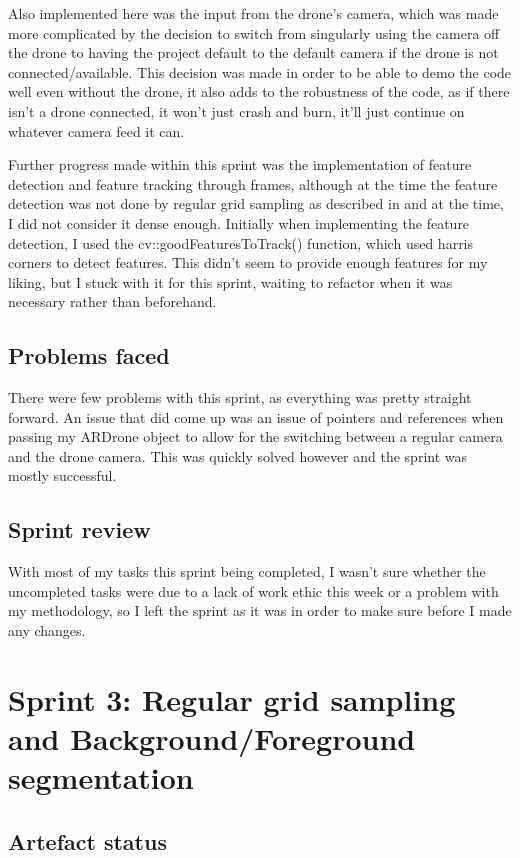 Also implemented here was the input from the drone's camera, which was made more complicated by the decision to switch from singularly using the camera off the drone to having the project default to the default camera if the drone is not connected/available. This decision was made in order to be able to demo the code well even without the drone, it also adds to the robustness of the code, as if there isn't a drone connected, it won't just crash and burn, it'll just continue on whatever camera feed it can.

Further progress made within this sprint was the implementation of feature detection and feature tracking through frames, although at the time the feature detection was not done by regular grid sampling as described in \cite{PhoneObstacleAvoidance} and at the time, I did not consider it dense enough. Initially when implementing the feature detection, I used the cv::goodFeaturesToTrack() function, which used harris corners to detect features. This didn't seem to provide enough features for my liking, but I stuck with it for this sprint, waiting to refactor when it was necessary rather than beforehand.

\subsection{Problems faced}
There were few problems with this sprint, as everything was pretty straight forward. An issue that did come up was an issue of pointers and references when passing my ARDrone object to allow for the switching between a regular camera and the drone camera. This was quickly solved however and the sprint was mostly successful.

\subsection{Sprint review}
With most of my tasks this sprint being completed, I wasn't sure whether the uncompleted tasks were due to a lack of work ethic this week or a problem with my methodology, so I left the sprint as it was in order to make sure before I made any changes.


\section{Sprint 3: Regular grid sampling and Background/Foreground segmentation}
\subsection{Artefact status}

